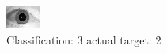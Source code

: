 \begin{figure}[h!]
\begin{center}
\includegraphics[width=0.60\columnwidth]{figures/ID1757_class_3_target_2.png}
\end{center}
\caption{ Classification: 3 actual target: 2}
\label{fig:ID1757_class_3_target_2}
\end{figure}
